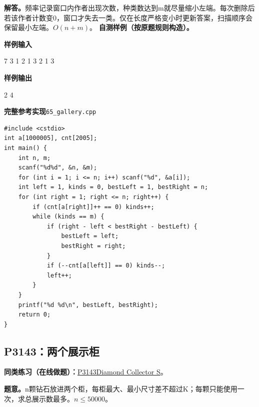\documentclass[UTF8,11pt,a4paper,fontset=none]{ctexart}
\newcommand{\practice}[2]{\par\noindent\textbf{同类练习（在线做题）：}\href{https://www.luogu.com.cn/problem/#1}{#1\quad #2}。\par}
\begin{document}
\noindent\textbf{解答。}频率记录窗口内作者出现次数，种类数达到m就尽量缩小左端。每次删除后若该作者计数变0，窗口才失去一类。仅在长度严格变小时更新答案，扫描顺序会保留最小左端。$O(n+m)$。
\textbf{自测样例（按原题规则构造）。}
\begin{tcolorbox}[samplebox,title={输入输出样例}]
\textbf{样例输入}
\begin{Sample}
7 3
1 2 1 3 2 1 3
\end{Sample}
\tcblower
\textbf{样例输出}
\begin{Sample}
2 4
\end{Sample}
\end{tcolorbox}
\par\noindent\begin{minipage}{\linewidth}
\textbf{完整参考实现}\quad\texttt{65\_gallery.cpp}
\begin{lstlisting}
#include <cstdio>
int a[1000005], cnt[2005];
int main() {
    int n, m;
    scanf("%d%d", &n, &m);
    for (int i = 1; i <= n; i++) scanf("%d", &a[i]);
    int left = 1, kinds = 0, bestLeft = 1, bestRight = n;
    for (int right = 1; right <= n; right++) {
        if (cnt[a[right]]++ == 0) kinds++;
        while (kinds == m) {
            if (right - left < bestRight - bestLeft) {
                bestLeft = left;
                bestRight = right;
            }
            if (--cnt[a[left]] == 0) kinds--;
            left++;
        }
    }
    printf("%d %d\n", bestLeft, bestRight);
    return 0;
}
\end{lstlisting}
\end{minipage}\par


\subsection{P3143：两个展示柜}

\practice{P3143}{[USACO16OPEN] Diamond Collector S}

\noindent\textbf{题意。}n颗钻石放进两个柜，每柜最大、最小尺寸差不超过K；每颗只能使用一次，求总展示数最多。$n\le50000$。
\end{document}
